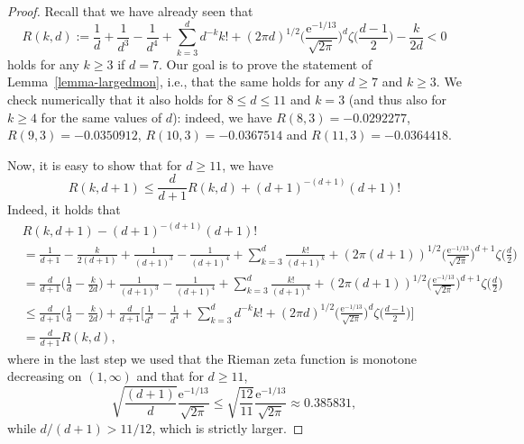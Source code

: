 \documentclass[a4paper, oneside, 11pt]{amsart}
\newcommand{\e}{\mathrm e}
\theoremstyle{definition}
\newcommand{\1}{\mathbbm{1}}
\newcommand{\0}{\mathbf{o}}
\numberwithin{equation}{section}
\begin{document}
\begin{proof}
    Recall that we have already seen that
    \[ 
    R(k,d)
    :=
    \frac{1}{d} + \frac{1}{d^3} -\frac{1}{d^4} + \sum_{k=3}^d d^{-k} k! +  (2\pi d)^{1/2} \Big( \frac{\e^{-1/13}}{\sqrt{2\pi}} \Big)^d \zeta\Big( \frac{d-1}{2} \Big) - \frac{k}{2d} < 0  
    \]
    holds for any $k\geq 3$ if $d=7$. 
    Our goal is to prove the statement of Lemma~\ref{lemma-largedmon}, i.e., that the same holds for any $d \geq 7$ and $k\geq 3$. We check numerically that it also holds for $8 \leq d \leq 11$ and $k=3$ (and thus also for $k\geq 4$ for the same values of $d$): indeed, we have $R(8,3)=-0.0292277$, $R(9,3)=-0.0350912$, $R(10,3)=-0.0367514$ and $R(11,3)=-0.0364418$. 

    Now, it is easy to show that for $d \geq 11$, we have
    \begin{equation}\label{Rfactor} 
        R(k,d+1) \leq \frac{d}{d+1} R(k,d) + (d+1)^{-(d+1)} (d+1)! 
    \end{equation}
    Indeed, it holds that
    \[ 
        \begin{aligned}
            & 
            R(k,d+1)-(d+1)^{-(d+1)}(d+1)! 
            \\ 
            &=
            \frac{1}{d+1}- \frac{k}{2(d+1)} + \frac{1}{(d+1)^3} -\frac{1}{(d+1)^4} + \sum_{k=3}^{d} \frac{ k!}{(d+1)^k} +  (2\pi (d+1))^{1/2} \Big( \frac{\e^{-1/13}}{\sqrt{2\pi}} \Big)^{d+1} \zeta\Big( \frac{d}{2} \Big)
            \\
            &=
            \frac{d}{d+1} \Big( \frac{1}{d}- \frac{k}{2d} \Big) + \frac{1}{(d+1)^3} -\frac{1}{(d+1)^4} + \sum_{k=3}^{d} \frac{ k!}{(d+1)^k} +  (2\pi (d+1))^{1/2} \Big( \frac{\e^{-1/13}}{\sqrt{2\pi}} \Big)^{d+1} \zeta\Big( \frac{d}{2} \Big)
            \\ 
            & \leq 
            \frac{d}{d+1} \Big( \frac{1}{d}- \frac{k}{2d} \Big) + \frac{d}{d+1} \bigg[ \frac{1}{d^3} -\frac{1}{d^4} + \sum_{k=3}^d d^{-k} k! +  (2\pi d)^{1/2} \Big( \frac{\e^{-1/13}}{\sqrt{2\pi}} \Big)^d \zeta\Big( \frac{d-1}{2} \Big) \bigg] 
            \\ 
            &=
            \frac{d}{d+1} R(k,d),
        \end{aligned}  
    \]
    where in the last step we used that the Rieman zeta function is monotone decreasing on $(1,\infty)$ and that for $d \geq 11$,
    \begin{equation*} 
        \sqrt{\frac{(d+1)}{ d}} \frac{\e^{-1/13}}{\sqrt{2\pi}} \leq \sqrt{\frac{12}{11}} \frac{\e^{-1/13}}{\sqrt{2\pi}}  \approx 0.385831, 
    \end{equation*}
    while $d/(d+1)>11/12$, which is strictly larger. 


\end{proof}
\end{document}
